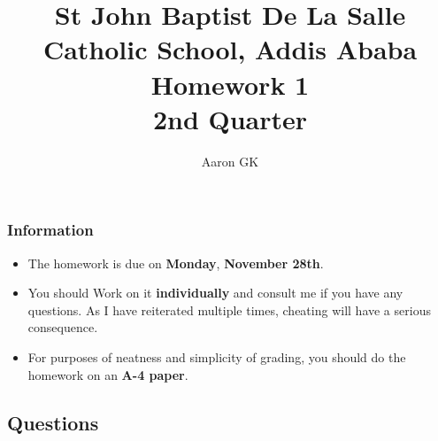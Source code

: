 \documentclass[9pt,addpoints]{exam}
\author{Aaron GK}
\begin{document}
	\title{St John Baptist De La Salle Catholic School, Addis Ababa\\
		\large Homework 1 \\
		2nd Quarter}
	\maketitle
	\begin{center}
		\subsubsection*{Information}
		\begin{itemize}
			\item The homework is due on \textbf{Monday}, \textbf{November 28th}.
			\item You should Work on it \textbf{individually} and consult me if you have any questions. As I have reiterated multiple times, cheating will have a serious consequence.
			\item For purposes of neatness and simplicity of grading, you should do the homework on an \textbf{A-4 paper}.
		\end{itemize}
	\end{center}
\begin{center}
		\subsection*{Questions}
\end{center}
	
\end{document}
